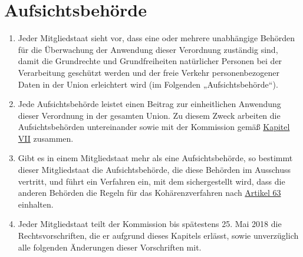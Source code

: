 \chapter{Aufsichtsbehörde}
\label{ch:51}


\begin{enumerate}

  \item Jeder Mitgliedstaat sieht vor, dass eine oder mehrere unabhängige Behörden für die Überwachung der Anwendung
   dieser Verordnung zuständig sind, damit die Grundrechte und Grundfreiheiten natürlicher Personen bei der
   Verarbeitung geschützt werden und der freie Verkehr personenbezogener Daten in der Union erleichtert wird
   (im Folgenden „Aufsichtsbehörde“).
  \label{itm:51-1}

  \item Jede Aufsichtsbehörde leistet einen Beitrag zur einheitlichen Anwendung dieser Verordnung in der gesamten Union.
   Zu diesem Zweck arbeiten die Aufsichtsbehörden untereinander sowie mit der Kommission gemäß \hyperref[part7]
   {Kapitel VII} zusammen.
  \label{itm:51-2}

  \item Gibt es in einem Mitgliedstaat mehr als eine Aufsichtsbehörde, so bestimmt dieser Mitgliedstaat die
   Aufsichtsbehörde, die diese Behörden im Ausschuss vertritt, und führt ein Verfahren ein, mit dem sichergestellt
   wird, dass die anderen Behörden die Regeln für das Kohärenzverfahren nach \hyperref[ch:63]{Artikel 63} einhalten.
  \label{itm:51-3}

  \item Jeder Mitgliedstaat teilt der Kommission bis spätestens 25. Mai 2018 die Rechtsvorschriften, die er aufgrund
   dieses Kapitels erlässt, sowie unverzüglich alle folgenden Änderungen dieser Vorschriften mit.
  \label{itm:51-4}

\end{enumerate}


